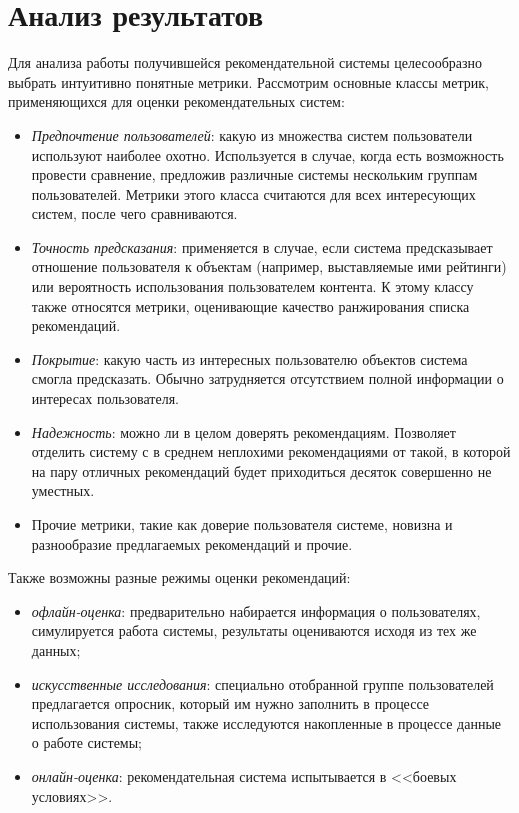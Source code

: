 \documentclass[14pt]{matmex-diploma}
\begin{document}



\section{Анализ результатов}
\indent Для анализа работы получившейся рекомендательной системы целесообразно выбрать интуитивно понятные метрики. Рассмотрим основные классы метрик, применяющихся для оценки рекомендательных систем\cite{rec_sys_handbook:evaluation}:
\begin{itemize}
    \item \textit{Предпочтение пользователей}: какую из множества систем пользователи используют наиболее охотно. Используется в случае, когда есть возможность провести сравнение, предложив различные системы нескольким группам пользователей. Метрики этого класса считаются для всех интересующих систем, после чего сравниваются.
    \item \textit{Точность предсказания}: применяется в случае, если система предсказывает отношение пользователя к объектам (например, выставляемые ими рейтинги) или вероятность использования пользователем контента. К этому классу также относятся метрики, оценивающие качество ранжирования списка рекомендаций.
    \item \textit{Покрытие}: какую часть из интересных пользователю объектов система смогла предсказать. Обычно затрудняется отсутствием полной информации о интересах пользователя.
    \item \textit{Надежность}: можно ли в целом доверять рекомендациям. Позволяет отделить систему с в среднем неплохими рекомендациями от такой, в которой на пару отличных рекомендаций будет приходиться десяток совершенно не уместных.
    \item Прочие метрики, такие как доверие пользователя системе, новизна и разнообразие предлагаемых рекомендаций и прочие.
\end{itemize}

\indent Также возможны разные режимы оценки рекомендаций:
\begin{itemize}
    \item \textit{офлайн-оценка}: предварительно набирается информация о пользователях, симулируется работа системы, результаты оцениваются исходя из тех же данных;
    \item \textit{искусственные исследования}: специально отобранной группе пользователей предлагается опросник, который им нужно заполнить в процессе использования системы, также исследуются накопленные в процессе данные о работе системы;
    \item \textit{онлайн-оценка}: рекомендательная система испытывается в <<боевых условиях>>.
\end{itemize}
\end{document}
